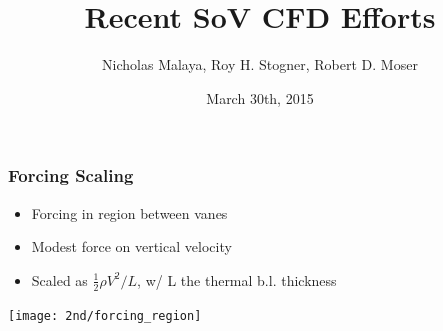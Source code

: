\documentclass[mathserif]{beamer}
\date{March 30th, 2015}
\author[Malaya, Stogner, Moser]{Nicholas Malaya, Roy H. Stogner, Robert
D. Moser}
\institute{The University of Texas at Austin}
\title[\libMesh]{Recent SoV CFD Efforts}
\begin{document}


\begin{frame}
 \frametitle{Forcing Scaling}
 \begin{itemize}
 \item Forcing in region between vanes
 \item Modest force on vertical velocity
 \item Scaled as $\frac{1}{2}\rho V^2 / L$, w/ L the thermal b.l. thickness
 \end{itemize}
 \begin{center}
  \texttt{[image: 2nd/forcing\_region]}\\
 \end{center}
\end{frame}

%
%
\end{document}

